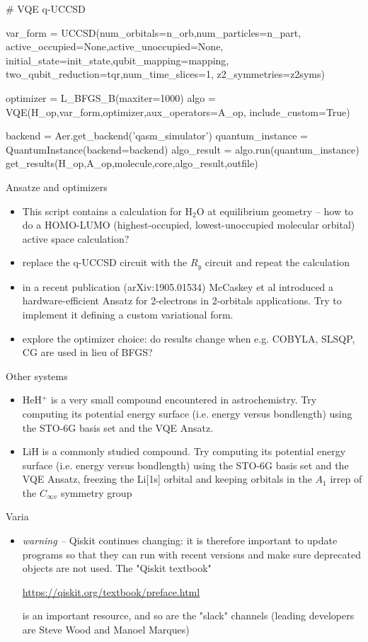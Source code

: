 \documentclass{article}
\begin{document}
\begin{python}
# VQE q-UCCSD

var_form  = UCCSD(num_orbitals=n_orb,num_particles=n_part,
                  active_occupied=None,active_unoccupied=None,
                  initial_state=init_state,qubit_mapping=mapping,
                  two_qubit_reduction=tqr,num_time_slices=1,
                  z2_symmetries=z2syms)

optimizer = L_BFGS_B(maxiter=1000)
algo      = VQE(H_op,var_form,optimizer,aux_operators=A_op, include_custom=True)

backend          = Aer.get_backend('qasm_simulator')
quantum_instance = QuantumInstance(backend=backend)
algo_result      = algo.run(quantum_instance)
get_results(H_op,A_op,molecule,core,algo_result,outfile)
\end{python}

Ansatze and optimizers
\begin{itemize}
\item This script contains a calculation for H$_2$O at equilibrium geometry -- 
how to do a HOMO-LUMO (highest-occupied, lowest-unoccupied molecular orbital) active space calculation?
\item replace the q-UCCSD circuit with the $R_y$ circuit and repeat the calculation
\item in a recent publication (arXiv:1905.01534) McCaskey et al introduced a hardware-efficient Ansatz for 2-electrons
in 2-orbitals applications. Try to implement it defining a custom variational form.
\item explore the optimizer choice: do results change when e.g. COBYLA, SLSQP, CG are used in lieu of BFGS?
\end{itemize}

Other systems
\begin{itemize}
\item HeH$^{+}$ is a very small compound encountered in astrochemistry. Try computing its potential energy surface
(i.e. energy versus bondlength) using the STO-6G basis set and the VQE Ansatz.
\item LiH is a commonly studied compound. Try computing its potential energy surface (i.e. energy versus bondlength) 
using the STO-6G basis set and the VQE Ansatz, freezing the Li[1s] orbital and keeping orbitals in the $A_1$ irrep of the
$C_{\infty v}$ symmetry group
\end{itemize}

Varia
\begin{itemize}
\item {\em{warning -- }} Qiskit continues changing: it is therefore important to update programs so that they can run
with recent versions and make sure deprecated objects are not used. 
The "Qiskit textbook"
\begin{center}
\url{https://qiskit.org/textbook/preface.html}
\end{center}
is an important resource, and so are the "slack" channels (leading developers are Steve Wood and Manoel Marques)
\end{itemize}



\end{document}

